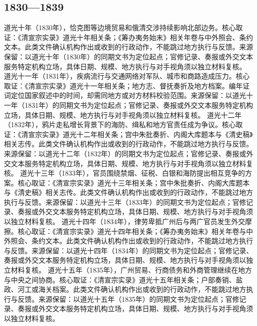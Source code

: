 \subsection{1830—1839}
道光十年（1830年），恰克图等边境贸易和俄清交涉持续影响北部边务。核心取证：《清宣宗实录》道光十年相关条；《筹办夷务始末》相关年卷与中外照会、条约文本。此类文件确认机构作出或收到的行政动作，不能跳过地方执行与反馈。来源保留：以道光十年（1830年）的同期文书为定位起点；官修记录、奏报或外交文本服务特定机构立场，具体日期、规模、地方执行与对手视角须以独立材料复核。
道光十一年（1831年），疾病流行与交通网络对军队、城市和商路造成压力。核心取证：《清宣宗实录》道光十一年相关条；地方志、督抚奏折及地方档案。编年证词定位国家叙述中的时间，却需同地方或对方材料校验范围。来源保留：以道光十一年（1831年）的同期文书为定位起点；官修记录、奏报或外交文本服务特定机构立场，具体日期、规模、地方执行与对手视角须以独立材料复核。
道光十二年（1832年），鸦片走私增长背景下的海防、缉私和地方官责任成为争议。核心取证：《清宣宗实录》道光十二年相关条；宫中朱批奏折、内阁大库题本与《清史稿》相关志传。此类文件确认机构作出或收到的行政动作，不能跳过地方执行与反馈。来源保留：以道光十二年（1832年）的同期文书为定位起点；官修记录、奏报或外交文本服务特定机构立场，具体日期、规模、地方执行与对手视角须以独立材料复核。
道光十三年（1833年），官员围绕禁烟、征税、白银和海防提出相互竞争的方案。核心取证：《清宣宗实录》道光十三年相关条；宫中朱批奏折、内阁大库题本与《清史稿》相关志传。此类文件确认机构作出或收到的行政动作，不能跳过地方执行与反馈。来源保留：以道光十三年（1833年）的同期文书为定位起点；官修记录、奏报或外交文本服务特定机构立场，具体日期、规模、地方执行与对手视角须以独立材料复核。
道光十四年（1834年），律劳卑抵广州后与两广官员发生外交摩擦。核心取证：《清宣宗实录》道光十四年相关条；《筹办夷务始末》相关年卷与中外照会、条约文本。此类文件确认机构作出或收到的行政动作，不能跳过地方执行与反馈。来源保留：以道光十四年（1834年）的同期文书为定位起点；官修记录、奏报或外交文本服务特定机构立场，具体日期、规模、地方执行与对手视角须以独立材料复核。
道光十五年（1835年），广州贸易、行商债务和外商管理继续在地方与中央之间协商。核心取证：《清宣宗实录》道光十五年相关条；户部奏销、盐政、河工或海关档案。此类文件确认机构作出或收到的行政动作，不能跳过地方执行与反馈。来源保留：以道光十五年（1835年）的同期文书为定位起点；官修记录、奏报或外交文本服务特定机构立场，具体日期、规模、地方执行与对手视角须以独立材料复核。
